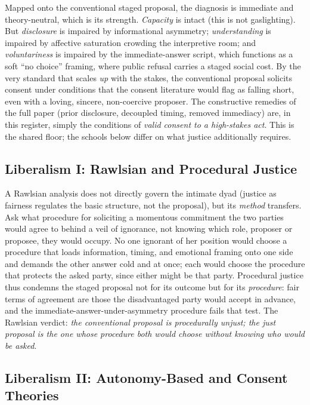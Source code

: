 Mapped onto the conventional staged proposal, the diagnosis is immediate and theory-neutral, which is its strength. \emph{Capacity} is intact (this is not gaslighting). But \emph{disclosure} is impaired by informational asymmetry; \emph{understanding} is impaired by affective saturation crowding the interpretive room; and \emph{voluntariness} is impaired by the immediate-answer script, which functions as a soft ``no choice'' framing, where public refusal carries a staged social cost. By the very standard that scales \emph{up} with the stakes, the conventional proposal solicits consent under conditions that the consent literature would flag as falling short, even with a loving, sincere, non-coercive proposer. The constructive remedies of the full paper (prior disclosure, decoupled timing, removed immediacy) are, in this register, simply the conditions of \emph{valid consent to a high-stakes act}. This is the shared floor; the schools below differ on what justice additionally requires.

\subsection{Liberalism I: Rawlsian and Procedural Justice}

A Rawlsian analysis does not directly govern the intimate dyad (justice as fairness regulates the basic structure, not the proposal), but its \emph{method} transfers. Ask what procedure for soliciting a momentous commitment the two parties would agree to behind a veil of ignorance, not knowing which role, proposer or proposee, they would occupy. No one ignorant of her position would choose a procedure that loads information, timing, and emotional framing onto one side and demands the other answer cold and at once; each would choose the procedure that protects the asked party, since either might be that party. Procedural justice thus condemns the staged proposal not for its outcome but for its \emph{procedure}: fair terms of agreement are those the disadvantaged party would accept in advance, and the immediate-answer-under-asymmetry procedure fails that test. The Rawlsian verdict: \emph{the conventional proposal is procedurally unjust; the just proposal is the one whose procedure both would choose without knowing who would be asked}.

\subsection{Liberalism II: Autonomy-Based and Consent Theories}

